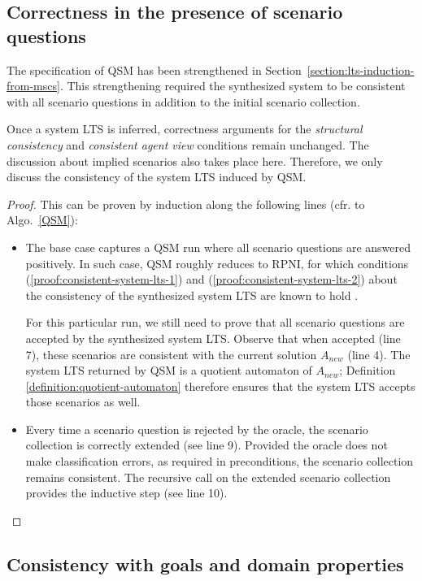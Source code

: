 
\subsection{Correctness in the presence of scenario questions\label{subsection:proof-with-scenario-questions}}

The specification of QSM has been strengthened in Section~\ref{section:lts-induction-from-mscs}. This strengthening required the synthesized system to be consistent with all scenario questions in addition to the initial scenario collection. 

Once a system LTS is inferred, correctness arguments for the \emph{structural consistency} and \emph{consistent agent view} conditions remain unchanged. The discussion about implied scenarios also takes place here. Therefore, we only discuss the consistency of the system LTS induced by QSM.

\begin{proof}
This can be proven by induction along the following lines (cfr. to Algo.~\ref{QSM}):
\begin{itemize}
\item The base case captures a QSM run where all scenario questions are answered positively. In such case, QSM roughly reduces to RPNI, for which conditions (\ref{proof:consistent-system-lts-1}) and (\ref{proof:consistent-system-lts-2}) about the consistency of the synthesized system LTS are known to hold \cite{Oncina:1993}.

For this particular run, we still need to prove that all scenario questions are accepted by the synthesized system LTS. Observe that when accepted (line 7), these scenarios are consistent with the current solution $A_{new}$ (line 4). The system LTS returned by QSM is a quotient automaton of $A_{new}$; Definition \ref{definition:quotient-automaton} therefore ensures that the system LTS accepts those scenarios as well.
\item Every time a scenario question is rejected by the oracle, the scenario collection is correctly extended (see line 9). Provided the oracle does not make classification errors, as required in preconditions, the scenario collection remains consistent. The recursive call on the extended scenario collection provides the inductive step (see line 10).
\end{itemize}
\end{proof}


\subsection{Consistency with goals and domain properties\label{subsection:proof-with-domain-knowledge}}

